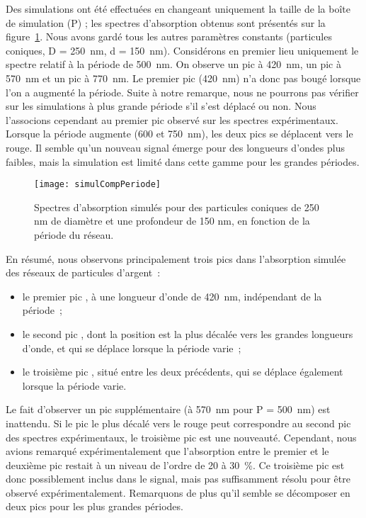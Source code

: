 Des simulations ont été effectuées en changeant uniquement la taille de la boîte de simulation (P) ; les spectres d’absorption obtenus sont présentés sur la figure~\ref{simulCompPeriode}. Nous avons gardé tous les autres paramètres constants (particules coniques, D = 250~nm, d = 150~nm). Considérons en premier lieu uniquement le spectre relatif à la période de 500~nm. On observe un pic à 420~nm, un pic à 570~nm et un pic à 770~nm. Le premier pic (420~nm) n’a donc pas bougé lorsque l’on a augmenté la période. Suite à notre remarque, nous ne pourrons pas vérifier sur les simulations à plus grande période s'il s'est déplacé ou non. Nous l'associons cependant au \og premier pic \fg{} observé sur les spectres expérimentaux. Lorsque la période augmente (600 et 750~nm), les deux pics se déplacent vers le rouge. Il semble qu'un nouveau signal émerge pour des longueurs d'ondes plus faibles, mais la simulation est limité dans cette gamme pour les grandes périodes.\par 
\begin{figure}[!htb]
\centering
\texttt{[image: simulCompPeriode]}
\caption{Spectres d’absorption simulés pour des particules coniques de 250 nm de diamètre et une profondeur de 150 nm, en fonction de la période du réseau.}
\label{simulCompPeriode}
\end{figure}
En résumé, nous observons principalement trois pics dans l'absorption simulée des réseaux de particules d'argent~:
\begin{itemize}
\item le \og premier pic \fg, à une longueur d'onde de 420~nm, indépendant de la période~;
\item le \og second pic \fg, dont la position est la plus décalée vers les grandes longueurs d'onde, et qui se déplace lorsque la période varie~;
\item le \og troisième pic \fg, situé entre les deux précédents, qui se déplace également lorsque la période varie. 
\end{itemize}
Le fait d'observer un pic supplémentaire (à 570~nm pour P = 500~nm) est inattendu. Si le pic le plus décalé vers le rouge peut correspondre au \og second pic \fg{} des spectres expérimentaux, le \og troisième pic \fg{} est une nouveauté. Cependant, nous avions remarqué expérimentalement que l'absorption entre le premier et le deuxième pic restait à un niveau de l'ordre de 20 à 30~\%. Ce troisième pic est donc possiblement inclus dans le signal, mais pas suffisamment résolu pour être observé expérimentalement. Remarquons de plus qu'il semble se décomposer en deux pics pour les plus grandes périodes.\par
